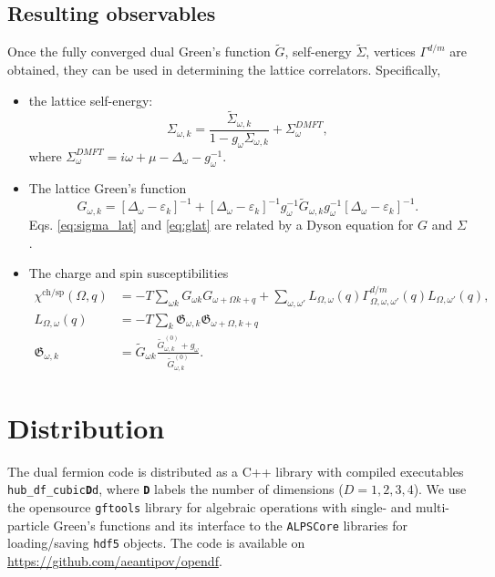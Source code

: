 \documentclass[3p,times,procedia]{elsarticle}
\begin{document}
\subsection{Resulting observables}
Once the fully converged dual Green's function $\tilde G$, self-energy $\tilde \Sigma$, vertices $\Gamma^{d/m}$ are obtained, they can be used in determining the lattice correlators. Specifically, 
\begin{itemize}
\item the lattice self-energy: 
\begin{equation}\label{eq:sigma_lat}
\Sigma_{\omega, k} = \frac{\tilde \Sigma_{\omega, k}}{1 - g_\omega \Sigma_{\omega, k}} + \Sigma^{DMFT}_{\omega},
\end{equation}
where $\Sigma^{DMFT}_{\omega} = i\omega + \mu - \Delta_{\omega} - g_\omega^{-1}$. 
\item The lattice Green's function
\begin{equation}\label{eq:glat}
G_{\omega,k} = \left[\Delta_{\omega} - \varepsilon_{k}\right]^{-1} + \left[\Delta_{\omega} - \varepsilon_{k}\right]^{-1} g_{\omega}^{-1} \tilde G_{\omega, k} g_{\omega}^{-1} \left[\Delta_{\omega} - \varepsilon_{k}\right]^{-1}.
\end{equation}
Eqs. \ref{eq:sigma_lat} and \ref{eq:glat} are related by a Dyson equation for $G$ and $\Sigma$. 
\item The charge and spin susceptibilities
\begin{align}
\chi^{\mathrm{ch/sp}} (\Omega, q) & = -T \sum_{\omega k} G_{\omega k} G_{\omega+\Omega k+q} + \sum_{\omega,\omega'} L_{\Omega, \omega}(q) \Gamma^{d/m}_{\Omega,\omega,\omega'}(q) L_{\Omega, \omega'}(q), \\
L_{\Omega, \omega}(q) & = -T \sum_k \mathfrak{G}_{\omega,k} \mathfrak{G}_{\omega + \Omega,k + q} \\
\mathfrak{G}_{\omega,k} & = \tilde G_{\omega k} \frac{\tilde G^{(0)}_{\omega, k} + g_\omega}{\tilde G^{(0)}_{\omega, k}}.
\end{align}
\end{itemize}

\section{Distribution}\label{sec:imp}
The dual fermion code is distributed as a C++ library with compiled executables \texttt{hub\_df\_cubic{\bf D}d}, where \texttt{\bf D} labels the number of dimensions ($D=1,2,3,4$). We use the opensource \texttt{gftools} library \cite{gftools} for algebraic operations with single- and multi-particle Green's functions and its interface to the \texttt{ALPSCore} libraries \cite{ALPSCore} for loading/saving \texttt{hdf5} objects. The code is available on \url{https://github.com/aeantipov/opendf}.
\end{document}
